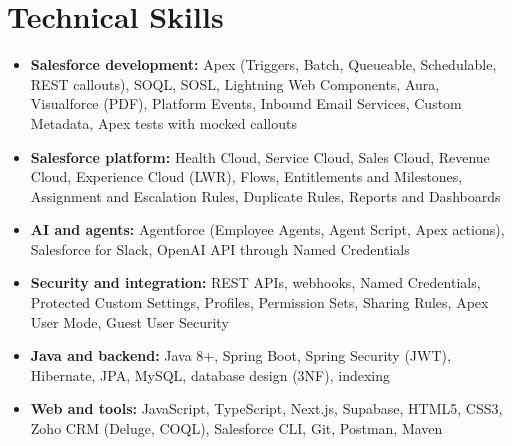 \documentclass[10pt,a4paper]{article}
\begin{document}
\section{Technical Skills}
\begin{itemize}
  \item \textbf{Salesforce development:} Apex (Triggers, Batch, Queueable, Schedulable, REST callouts),
        SOQL, SOSL, Lightning Web Components, Aura, Visualforce (PDF), Platform Events,
        Inbound Email Services, Custom Metadata, Apex tests with mocked callouts
  \item \textbf{Salesforce platform:} Health Cloud, Service Cloud, Sales Cloud, Revenue Cloud,
        Experience Cloud (LWR), Flows, Entitlements and Milestones, Assignment and Escalation Rules,
        Duplicate Rules, Reports and Dashboards
  \item \textbf{AI and agents:} Agentforce (Employee Agents, Agent Script, Apex actions),
        Salesforce for Slack, OpenAI API through Named Credentials
  \item \textbf{Security and integration:} REST APIs, webhooks, Named Credentials, Protected Custom
        Settings, Profiles, Permission Sets, Sharing Rules, Apex User Mode, Guest User Security
  \item \textbf{Java and backend:} Java 8+, Spring Boot, Spring Security (JWT), Hibernate, JPA,
        MySQL, database design (3NF), indexing
  \item \textbf{Web and tools:} JavaScript, TypeScript, Next.js, Supabase, HTML5, CSS3,
        Zoho CRM (Deluge, COQL), Salesforce CLI, Git, Postman, Maven
\end{itemize}

\end{document}
